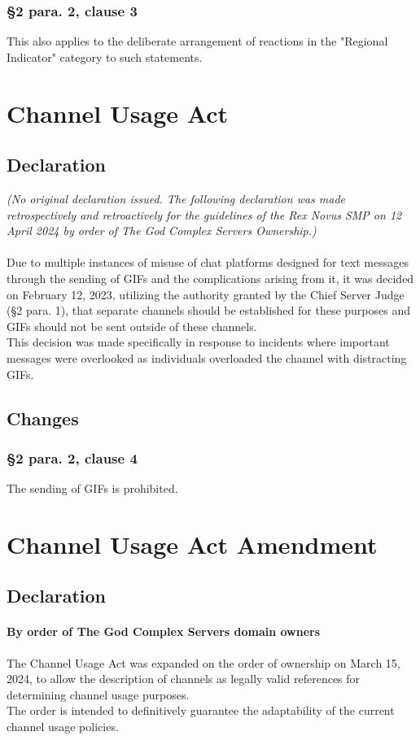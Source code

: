 \documentclass{cjs9}
\begin{document}
\subsubsection*{§2 para. 2, clause 3}
This also applies to the deliberate arrangement of reactions in the "Regional Indicator" category to such statements.
\newpage
\section{Channel Usage Act}
\subsection{Declaration}
\textit{(No original declaration issued. The following declaration was made retrospectively and retroactively for the guidelines of the Rex Novus SMP on 12 April 2024 by order of The God Complex Servers Ownership.)\\\\}
Due to multiple instances of misuse of chat platforms designed for text messages through the sending of GIFs and the complications arising from it, it was decided on February 12, 2023, utilizing the authority granted by the Chief Server Judge (§2 para. 1), that separate channels should be established for these purposes and GIFs should not be sent outside of these channels.
\\This decision was made specifically in response to incidents where important messages were overlooked as individuals overloaded the channel with distracting GIFs.
\subsection{Changes}
\subsubsection*{§2 para. 2, clause 4}
The sending of GIFs is prohibited.
\newpage
\section{Channel Usage Act Amendment}
\subsection{Declaration}
\paragraph{By order of The God Complex Servers domain owners\\}
The Channel Usage Act was expanded on the order of ownership on March 15, 2024, to allow the description of channels as legally valid references for determining channel usage purposes.
\\The order is intended to definitively guarantee the adaptability of the current channel usage policies.
\end{document}
